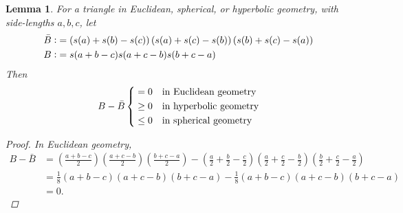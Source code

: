 \documentclass[12pt,notitlepage]{amsart}%
\newtheorem{lemma}[theorem]{Lemma}
\begin{document}
\begin{lemma}\label{B}
For a triangle in Euclidean, spherical, or hyperbolic geometry, with side-lengths $a,b,c$, let 
\begin{align*}
	\bar{B} \vcentcolon &= \left( s(a)+s(b)-s(c)\right) 	\left( s(a)+s(c)-s(b)\right) \left( s(b)+s(c)-    s(a)\right)\\
	B \vcentcolon &= s(a+b-c)s(a+c-b)s(b+c-a)
\end{align*}
Then
\begin{equation*}
	B-\bar{B}\left\{
	\begin{aligned}
		&=0 		&&\textnormal{in Euclidean geometry} \\
		&\geq 0		&&\textnormal{in hyperbolic geometry} \\
		&\leq 0		&&\textnormal{in spherical geometry} \\
	\end{aligned}
	\right.
\end{equation*}
\begin{proof}
	In Euclidean geometry,
	\begin{align*}
	B-\bar{B}&=\left(\frac{a+b-c}{2}\right)\left(\frac{a+c-b}{2}\right)\left(\frac{b+c-a}{2}\right)-\left(\frac{a}{2}+\frac{b}{2}-\frac{c}{2}\right)\left(\frac{a}{2}+\frac{c}{2}-\frac{b}{2}\right)\left(\frac{b}{2}+\frac{c}{2}-\frac{a}{2}\right)\\
    &=\frac{1}{8}(a+b-c)(a+c-b)(b+c-a)-\frac{1}{8}(a+b-c)(a+c-b)(b+c-a)\\
    &=0.
	\end{align*}
    

\end{proof}
\end{lemma}
\end{document}

